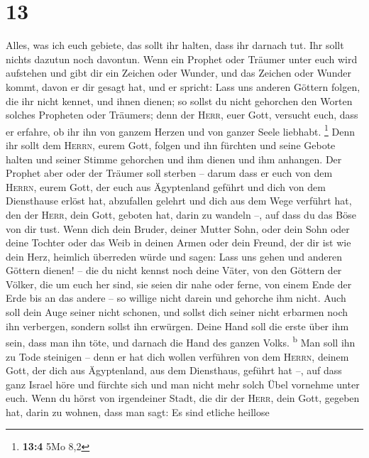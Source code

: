 \hypertarget{section-12}{%
\section{13}\label{section-12}}

 Alles, was ich euch gebiete, das sollt ihr halten, dass
ihr darnach tut. Ihr sollt nichts dazutun noch davontun. 
Wenn ein Prophet oder Träumer unter euch wird aufstehen und gibt dir ein
Zeichen oder Wunder,  und das Zeichen oder Wunder kommt,
davon er dir gesagt hat, und er spricht: Lass uns anderen Göttern
folgen, die ihr nicht kennet, und ihnen dienen;  so sollst
du nicht gehorchen den Worten solches Propheten oder Träumers; denn der
\textsc{Herr}, euer Gott, versucht euch, dass er erfahre, ob ihr ihn von
ganzem Herzen und von ganzer Seele liebhabt. \footnote{\textbf{13:4} 5Mo
  8,2}  Denn ihr sollt dem \textsc{Herrn}, eurem Gott,
folgen und ihn fürchten und seine Gebote halten und seiner Stimme
gehorchen und ihm dienen und ihm anhangen.  Der Prophet
aber oder der Träumer soll sterben -- darum dass er euch von dem
\textsc{Herrn}, eurem Gott, der euch aus Ägyptenland geführt und dich
von dem Diensthause erlöst hat, abzufallen gelehrt und dich aus dem Wege
verführt hat, den der \textsc{Herr}, dein Gott, geboten hat, darin zu
wandeln --, auf dass du das Böse von dir tust.  Wenn dich
dein Bruder, deiner Mutter Sohn, oder dein Sohn oder deine Tochter oder
das Weib in deinen Armen oder dein Freund, der dir ist wie dein Herz,
heimlich überreden würde und sagen: Lass uns gehen und anderen Göttern
dienen! -- die du nicht kennst noch deine Väter,  von den
Göttern der Völker, die um euch her sind, sie seien dir nahe oder ferne,
von einem Ende der Erde bis an das andere --  so willige
nicht darein und gehorche ihm nicht. Auch soll dein Auge seiner nicht
schonen, und sollst dich seiner nicht erbarmen noch ihn verbergen,
 sondern sollst ihn erwürgen. Deine Hand soll die erste
über ihm sein, dass man ihn töte, und darnach die Hand des ganzen Volks.
\textsuperscript{b}  Man soll ihn zu Tode steinigen --
denn er hat dich wollen verführen von dem \textsc{Herrn}, deinem Gott,
der dich aus Ägyptenland, aus dem Diensthaus, geführt hat --,
 auf dass ganz Israel höre und fürchte sich und man nicht
mehr solch Übel vornehme unter euch.  Wenn du hörst von
irgendeiner Stadt, die dir der \textsc{Herr}, dein Gott, gegeben hat,
darin zu wohnen, dass man sagt:  Es sind etliche heillose
